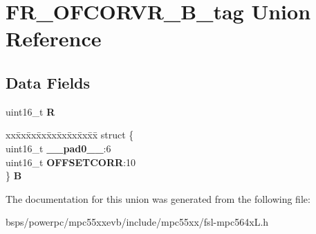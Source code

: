 \hypertarget{unionFR__OFCORVR__16B__tag}{}\section{F\+R\+\_\+\+O\+F\+C\+O\+R\+V\+R\+\_\+B\+\_\+tag Union Reference}
\label{unionFR__OFCORVR__16B__tag}
\subsection*{Data Fields}
\begin{DoxyCompactItemize}
\item 
\mbox{\label{unionFR__OFCORVR__16B__tag_a5217f9b53de1ab9850507acddcdbf77f}} 
uint16\+\_\+t {\bfseries R}
\item 
\mbox{\label{unionFR__OFCORVR__16B__tag_ac5d87cb38c5d7859c91f3d544a1b661e}} 
\begin{tabbing}
xx\=xx\=xx\=xx\=xx\=xx\=xx\=xx\=xx\=\kill
struct \{\\
\>uint16\_t {\bfseries \_\_pad0\_\_}:6\\
\>uint16\_t {\bfseries OFFSETCORR}:10\\
\} {\bfseries B}\\

\end{tabbing}\end{DoxyCompactItemize}


The documentation for this union was generated from the following file\+:\begin{DoxyCompactItemize}
\item 
bsps/powerpc/mpc55xxevb/include/mpc55xx/fsl-\/mpc564x\+L.\+h\end{DoxyCompactItemize}
